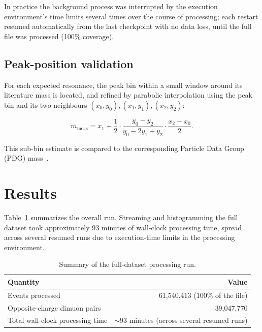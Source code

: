 \documentclass[11pt,a4paper]{article}
\begin{document}
In practice the background process was interrupted by the execution environment's time limits
several times over the course of processing; each restart resumed automatically from the last
checkpoint with no data loss, until the full file was processed (100\% coverage).

\subsection{Peak-position validation}

For each expected resonance, the peak bin within a small window around its literature mass is
located, and refined by parabolic interpolation using the peak bin and its two neighbours
$(x_0,y_0),(x_1,y_1),(x_2,y_2)$:

\begin{equation}
m_{\text{meas}} = x_1 + \frac{1}{2}\cdot\frac{y_0-y_2}{y_0-2y_1+y_2}\cdot\frac{x_2-x_0}{2}.
\label{eq:parabolic}
\end{equation}

This sub-bin estimate is compared to the corresponding Particle Data Group (PDG)
mass~\cite{pdg}.

\section{Results}

Table~\ref{tab:summary} summarizes the overall run. Streaming and histogramming the full dataset
took approximately 93 minutes of wall-clock processing time, spread across several resumed runs
due to execution-time limits in the processing environment.

\begin{table}[h]
\centering
\begin{tabular}{@{}lr@{}}
\toprule
\textbf{Quantity} & \textbf{Value} \\
\midrule
Events processed & 61,540,413 (100\% of the file) \\
Opposite-charge dimuon pairs & 39,047,770 \\
Total wall-clock processing time & $\sim$93 minutes (across several resumed runs) \\
\bottomrule
\end{tabular}
\caption{Summary of the full-dataset processing run.}
\label{tab:summary}
\end{table}
\end{document}
